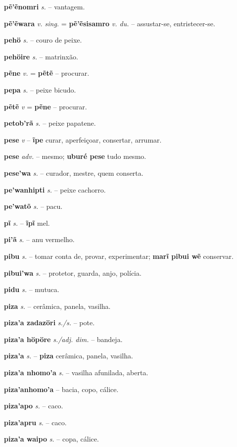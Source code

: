 \textbf{pẽ'ẽnomri} \textit{s.} -- vantagem.

\textbf{pẽ'ẽwara} \textit{v. sing.} = \textbf{pẽ'ẽsisamro} \textit{v. du.} -- assustar-se, entristecer-se.

\textbf{pehö} \textit{s.} -- couro de peixe.

\textbf{pehöire} \textit{s.} -- matrinxão.

\textbf{pẽne} \textit{v.} = \textbf{pẽtẽ} -- procurar.

\textbf{pepa} \textit{s.} -- peixe bicudo.

\textbf{pẽtẽ} \textit{v} = \textbf{pẽne} -- procurar.

\textbf{petob'rã} \textit{s.} -- peixe papatene.

\textbf{pese} \textit{v} -- \textbf{ĩpe} curar, aperfeiçoar, consertar, arrumar.

\textbf{pese} \textit{adv.} -- mesmo; \textbf{uburé pese} tudo mesmo.

\textbf{pese'wa} \textit{s.} -- curador, mestre, quem conserta.

\textbf{pe'wanhipti} \textit{s.} -- peixe cachorro.

\textbf{pe'watõ} \textit{s.} -- pacu.

\textbf{pĩ} \textit{s.} -- \textbf{ĩpĩ} mel.

\textbf{pi'ã} \textit{s.} -- anu vermelho.

\textbf{pibu} \textit{s.} -- tomar conta de, provar, experimentar; \textbf{marĩ pibui wẽ} conservar.

\textbf{pibui'wa} \textit{s.} -- protetor, guarda, anjo, polícia.

\textbf{pidu} \textit{s.} -- mutuca.

\textbf{piza} \textit{s.} -- cerâmica, panela, vasilha.

\textbf{piza'a zadazöri} \textit{s./s.} -- pote.

\textbf{piza'a höpöre} \textit{s./adj. dim.} -- bandeja.

\textbf{piza'a} \textit{s.} -- \textbf{piza} cerâmica, panela, vasilha.

\textbf{piza'a nhomo'a} \textit{s.} -- vasilha afunilada, aberta.

\textbf{piza'anhomo'a} -- bacia, copo, cálice.

\textbf{piza'apo} \textit{s.} -- caco.

\textbf{piza'apru} \textit{s.} -- caco.

\textbf{piza'a waipo} \textit{s.} -- copa, cálice.

